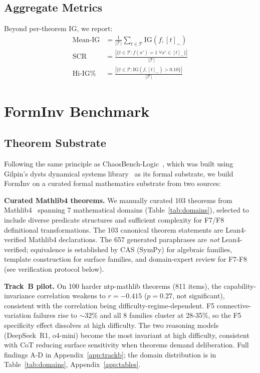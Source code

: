 \documentclass{article}
\newcommand{\IG}{\mathrm{IG}}
\newcommand{\SCR}{\mathrm{SCR}}
\newcommand{\Eclass}[1]{[#1]_{\sim}}
\begin{document}
\subsection{Aggregate Metrics}

Beyond per-theorem IG, we report:
\begin{align}
\text{Mean-IG} &= \frac{1}{|\mathcal{T}|} \sum_{t \in \mathcal{T}} \IG(f, \Eclass{t}) \\
\SCR &= \frac{|\{t \in \mathcal{T} : f(x')=1\;\forall x' \in \Eclass{t}\}|}{|\mathcal{T}|} \\
\text{Hi-IG\%} &= \frac{|\{t \in \mathcal{T} : \IG(f, \Eclass{t}) > 0.10\}|}{|\mathcal{T}|}
\end{align}

\section{FormInv Benchmark}
\label{sec:benchmark}

\subsection{Theorem Substrate}

Following the same principle as ChaosBench-Logic~\citep{chaosbench2026},
which was built using Gilpin's dysts dynamical systems library~\citep{gilpin2021dysts}
as its formal substrate, we build FormInv on a curated formal mathematics substrate from two sources:

\textbf{Curated Mathlib4 theorems.}
We manually curated 103 theorems from Mathlib4~\citep{mathlib2020,baanen2025mathlib4} spanning 7 mathematical domains
(Table~\ref{tab:domains}), selected to include diverse predicate structures and sufficient
complexity for F7/F8 definitional transformations.
The 103 canonical theorem statements are Lean4-verified Mathlib4 declarations.
The 657 generated paraphrases are \emph{not} Lean4-verified; equivalence is established
by CAS (SymPy) for algebraic families, template construction for surface families,
and domain-expert review for F7-F8 (see verification protocol below).

\textbf{Track~B pilot.} On 100 harder ntp-mathlib theorems (811 items), the capability-invariance correlation weakens to $r = -0.415$ ($p = 0.27$, not significant), consistent with the correlation being difficulty-regime-dependent. F5 connective-variation failures rise to $\sim$32\% and all 8 families cluster at 28-35\%, so the F5 specificity effect dissolves at high difficulty. The two reasoning models (DeepSeek~R1, o4-mini) become the most invariant at high difficulty, consistent with CoT reducing surface sensitivity when theorems demand deliberation. Full findings A-D in Appendix~\ref{app:trackb}; the domain distribution is in Table~\ref{tab:domains}, Appendix~\ref{app:tables}.
\end{document}
